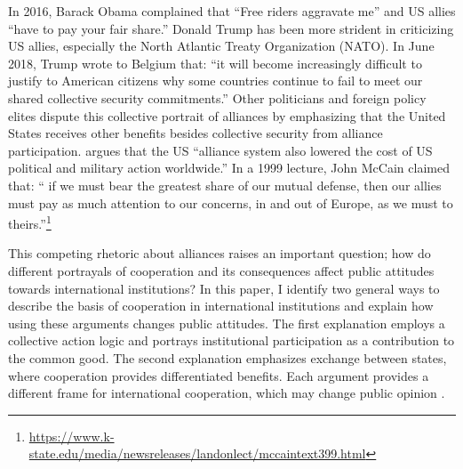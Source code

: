 \documentclass[12pt]{article}
\begin{document}
In 2016, Barack Obama complained that ``Free riders aggravate me'' and US allies ``have to pay your fair share.'' 
Donald Trump has been more strident in criticizing US allies, especially the North Atlantic Treaty Organization (NATO). 
In June 2018, Trump wrote to Belgium that: ``it will become increasingly difficult to justify to American citizens why some countries continue to fail to meet our shared collective security commitments.''
Other politicians and foreign policy elites dispute this collective portrait of alliances by emphasizing that the United States receives other benefits besides collective security from alliance participation. 
\citet[pg. 129]{RappHooper2020} argues that the US ``alliance system also lowered the cost of US political and military action worldwide.'' 
In a 1999 lecture, John McCain claimed that: `` if we must bear the greatest share of our mutual defense, then our allies must pay as much attention to our concerns, in and out of Europe, as we must to theirs.''\footnote{\url{https://www.k-state.edu/media/newsreleases/landonlect/mccaintext399.html}} 




This competing rhetoric about alliances raises an important question; how do different portrayals of cooperation and its consequences affect public attitudes towards international institutions? 
In this paper, I identify two general ways to describe the basis of cooperation in international institutions and explain how using these arguments changes public attitudes. 
The first explanation employs a collective action logic and portrays institutional participation as a contribution to the common good. 
The second explanation emphasizes exchange between states, where cooperation provides differentiated benefits.
Each argument provides a different frame for international cooperation, which may change public opinion \citep{ChongDruckman2007}.  
\end{document}
